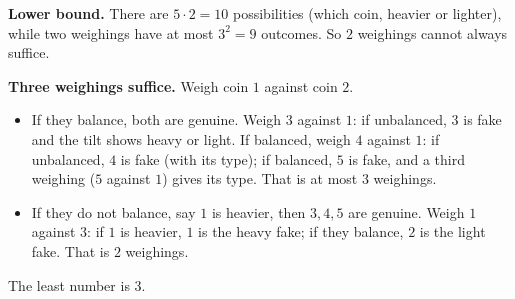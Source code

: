 \textbf{Lower bound.} There are $5\cdot2=10$ possibilities (which coin, heavier or lighter), while two weighings have at most $3^2=9$ outcomes. So $2$ weighings cannot always suffice.

\textbf{Three weighings suffice.} Weigh coin $1$ against coin $2$.
\begin{itemize}
\item If they balance, both are genuine. Weigh $3$ against $1$: if unbalanced, $3$ is fake and the tilt shows heavy or light. If balanced, weigh $4$ against $1$: if unbalanced, $4$ is fake (with its type); if balanced, $5$ is fake, and a third weighing ($5$ against $1$) gives its type. That is at most $3$ weighings.
\item If they do not balance, say $1$ is heavier, then $3,4,5$ are genuine. Weigh $1$ against $3$: if $1$ is heavier, $1$ is the heavy fake; if they balance, $2$ is the light fake. That is $2$ weighings.
\end{itemize}
The least number is $\boxed{3}$.
